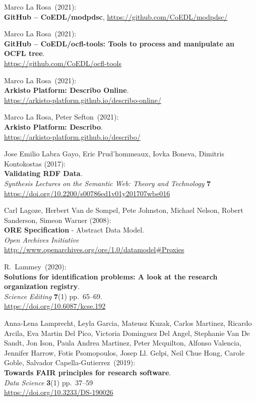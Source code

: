 \begin{thebibliography}{9}
Marco La Rosa~(2021):\\
\textbf{GitHub -- CoEDL/modpdsc},
\url{https://github.com/CoEDL/modpdsc/}

Marco La Rosa~(2021):\\
\textbf{GitHub -- CoEDL/ocfl-tools: Tools to process and manipulate an OCFL tree}.\\
\url{https://github.com/CoEDL/ocfl-tools}

Marco La Rosa~(2021):\\
\textbf{Arkisto Platform: Describo Online}.\\
\url{https://arkisto-platform.github.io/describo-online/}

Marco La Rosa, Peter Sefton~(2021):\\
\textbf{Arkisto Platform: Describo}.\\
\url{https://arkisto-platform.github.io/describo/}


Jose Emilio Labra Gayo, Eric Prud'hommeaux, Iovka Boneva, Dimitris
Kontokostas (2017): \\
\textbf{Validating {RDF Data}}. \\
\emph{Synthesis Lectures on the Semantic Web: Theory and Technology} \textbf{7} \\
\url{https://doi.org/10.2200/s00786ed1v01y201707wbe016}

Carl Lagoze, 
Herbert Van de Sompel, 
Pete Johnston, 
Michael Nelson, 
Robert Sanderson, 
Simeon Warner (2008):\\
\textbf{ORE Specification} - {Abstract Data Model}. \\
\emph{Open Archives Initiative}\\
\url{http://www.openarchives.org/ore/1.0/datamodel#Proxies} 

R.~Lammey~(2020):\\
\textbf{Solutions for identification problems: A look at the research
organization registry}.\\
\emph{Science Editing} \textbf{7}(1) pp.~65--69.\\
\url{https://doi.org/10.6087/kcse.192}

Anna-Lena Lamprecht, Leyla Garcia, Mateusz Kuzak, Carlos
Martinez, Ricardo Arcila, Eva Martin Del Pico, Victoria Dominguez Del
Angel, Stephanie Van De Sandt, Jon Ison, Paula Andrea Martinez, Peter
Mcquilton, Alfonso Valencia, Jennifer Harrow, Fotis Psomopoulos, Josep
Ll. Gelpi, Neil Chue Hong, Carole Goble, Salvador Capella-Gutierrez~(2019):\\
\textbf{Towards FAIR principles for research software}.\\
\emph{Data Science} \textbf{3}(1) pp.~37--59\\
\url{https://doi.org/10.3233/DS-190026}


\end{thebibliography}
